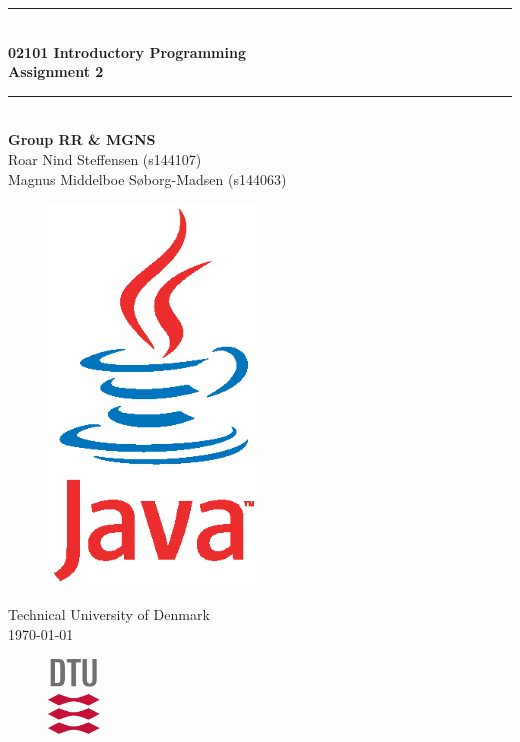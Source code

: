 \begin{titlepage}
\centering
\parindent=0pt
\newcommand{\HRule}{\rule{\textwidth}{1mm}}
 \HRule\\[1cm]\huge\textbf
{02101 Introductory Programming \\Assignment 2}\\[0.1cm]
\HRule\\[3cm]\vspace{-1 cm} \textbf{\Large{Group RR \& MGNS}}\\
\large{
Roar Nind Steffensen (s144107)\\
Magnus Middelboe Søborg-Madsen (s144063)}

\vspace{1 cm}

\begin{figure}[H]
\centering
\includegraphics[width=0.5\textwidth]{java.eps}
\label{fig:front}
\end{figure}

 \normalsize %
Technical University of Denmark\\
\today
\vspace{0.5cm}
\begin{figure}[h]
    \centering
    \includegraphics[height=2cm]{DTUlogo.png}
\end{figure}
\end{titlepage}